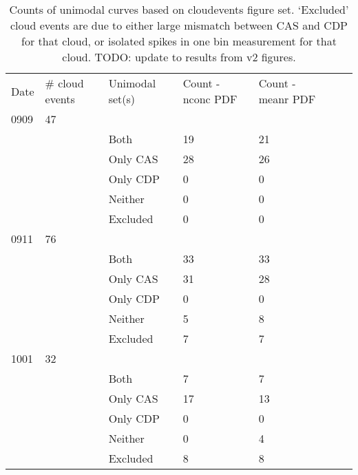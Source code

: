 \documentclass{article}
\begin{document}
\begin{table}[ht]
\centering
\begin{tabular}{lllllll}
Date & \# cloud events    & Unimodal set(s) & Count - nconc PDF & Count - meanr PDF        \\ 
0909 & 47                 &                 &                   &                          \\
     &                    & Both            & 19                & 21                       \\
     &                    & Only CAS        & 28                & 26                       \\
     &                    & Only CDP        & 0                 & 0                        \\
     &                    & Neither         & 0                 & 0                        \\
     &                    & Excluded        & 0                 & 0                        \\
0911 & 76                 &                 &                   &                          \\
     &                    & Both            & 33                & 33                       \\
     &                    & Only CAS        & 31                & 28                       \\
     &                    & Only CDP        & 0                 & 0                        \\
     &                    & Neither         & 5                 & 8                        \\
     &                    & Excluded        & 7                 & 7                        \\
1001 & 32                 &                 &                   &                          \\
     &                    & Both            & 7                 & 7                        \\
     &                    & Only CAS        & 17                & 13                       \\
     &                    & Only CDP        & 0                 & 0                        \\
     &                    & Neither         & 0                 & 4                        \\
     &                    & Excluded        & 8                 & 8                       
\end{tabular}
\caption{Counts of unimodal curves based on cloudevents figure set. `Excluded' cloud events are due to either large mismatch between CAS and CDP for that cloud, or isolated spikes in one bin measurement for that cloud. TODO: update to results from v2 figures.}
\label{unimodal}
\end{table}
\end{document}
